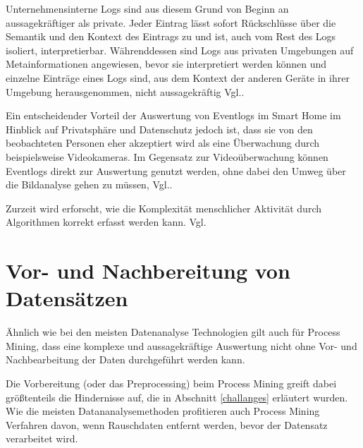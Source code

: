 Unternehmensinterne Logs sind aus diesem Grund von Beginn an aussagekräftiger als private. Jeder Eintrag lässt sofort Rückschlüsse über die Semantik und den Kontext des Eintrags zu und ist, auch vom Rest des Logs isoliert, interpretierbar. Währenddessen sind Logs aus privaten Umgebungen auf Metainformationen angewiesen, bevor sie interpretiert werden können und einzelne Einträge eines Logs sind, aus dem Kontext der anderen Geräte in ihrer Umgebung herausgenommen, nicht aussagekräftig Vgl.\cite{Jaroucheh2011}.

Ein entscheidender Vorteil der Auswertung von Eventlogs im Smart Home im Hinblick auf Privatsphäre und Datenschutz jedoch ist, dass sie von den beobachteten Personen eher akzeptiert wird als eine Überwachung durch beispielsweise Videokameras. Im Gegensatz zur Videoüberwachung können Eventlogs direkt zur Auswertung genutzt werden, ohne dabei den Umweg über die Bildanalyse gehen zu müssen, Vgl.\cite{TaxSidorova}.

Zurzeit wird erforscht, wie die Komplexität menschlicher Aktivität durch Algorithmen korrekt erfasst werden kann. Vgl.\cite{Tax2019}



\section{Vor- und Nachbereitung von Datensätzen}
Ähnlich wie bei den meisten Datenanalyse Technologien gilt auch für Process Mining, dass eine komplexe und aussagekräftige Auswertung nicht ohne Vor- und Nachbearbeitung der Daten durchgeführt werden kann.

Die Vorbereitung (oder das Preprocessing) beim Process Mining greift dabei größtenteils die Hindernisse auf, die in Abschnitt \ref{challanges} erläutert wurden. Wie die meisten Datananalysemethoden profitieren auch Process Mining Verfahren davon, wenn Rauschdaten entfernt werden, bevor der Datensatz verarbeitet wird. 

